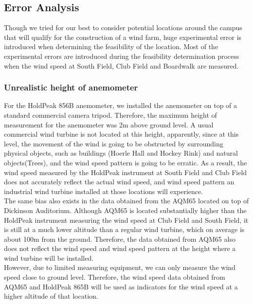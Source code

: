 \documentclass[review]{elsarticle}
\begin{document}
\subsection{Error Analysis}
\label{sec:analysis:erroranalysis}

Though we tried for our best to consider potential locations around the campus that will qualify for the construction of a wind farm, huge experimental error is introduced when determining 
the feasibility of the location. Most of the experimental errors are introduced during the feasibility determination process when the wind speed at South Field, Club Field and Boardwalk are measured.

\subsubsection{Unrealistic height of anemometer}
\label{sec:analysis:erroranalysis:unrealisticheight}
For the HoldPeak 856B anemometer, we installed the anemometer on top of a standard commercial camera tripod. Therefore, the maximum height of measurement for the anemometer was 2m above ground level. 
A usual commercial wind turbine is not located at this height, apparently, since at this level, the movement of the wind is going to be obstructed by surrounding physical objects, such as buildings 
(Hoerle Hall and Hockey Rink) and natural objects(Trees), and the wind speed pattern is going to be erratic. As a result, the wind speed measured by the HoldPeak instrument at South Field and 
Club Field does not accurately reflect the actual wind speed, and wind speed pattern an industrial wind turbine installed at those locations will experience. 
\\\indent The same bias also exists in the data obtained from the AQM65 located on top of Dickinson Auditorium. Although AQM65 is located substantially higher than the HoldPeak instrument measuring the wind speed at Club Field and South Field, it is still at a much lower altitude than a regular wind turbine, which on average is about 100m from the ground. Therefore, the data obtained from 
AQM65 also does not reflect the wind speed and wind speed pattern at the height where a wind turbine will be installed. 
\\\indent However, due to limited measuring equipment, we can only measure the wind speed close to ground level. Therefore, 
the wind speed data obtained from AQM65 and HoldPeak 865B will be used as indicators for the wind speed at a higher altitude of that location.
\end{document}
